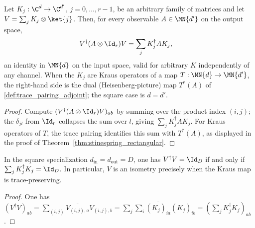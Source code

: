 \begin{theorem}\label{thm:stinespring_dual_representation}
    \leanok
    Let $K_j:\C^{d}\to\C^{d'}$, $j=0,\dots,r-1$, be an arbitrary family of
    matrices and let $V=\sum_j K_j\otimes\ket{j}$. Then, for every observable
    $A\in\MN{d'}$ on the output space,
    \begin{align}
        V^\dagger(A\otimes\Id_r)V
        &=\sum_j K_j^\dagger A K_j,
        \label{eq:representations_stinespring_dual}
    \end{align}
    an identity in $\MN{d}$ on the input space, valid for arbitrary $K$
    independently of any channel. When the $K_j$ are Kraus operators of a map
    $T:\MN{d}\to\MN{d'}$, the right-hand side is the dual
    (Heisenberg-picture) map $T^*(A)$ of \ref{def:trace_pairing_adjoint}; the
    square case is $d=d'$.
\end{theorem}

\begin{proof}
    \leanok
    Compute $(V^\dagger(A\otimes\Id_r)V)_{ab}$
    by summing over the product index $(i,j)$;
    the $\delta_{jl}$ from $\Id_r$ collapses the sum over $l$, giving
    $\sum_j K_j^\dagger A K_j$. For Kraus operators of $T$, the trace
    pairing identifies this sum with $T^*(A)$, as displayed in the proof of
    Theorem~\ref{thm:stinespring_rectangular}.
\end{proof}

\begin{theorem}\label{thm:stinespringV_isometry_iff_kraus_normalized}
    \leanok
    In the square specialization
    $d_{\mathrm{in}}=d_{\mathrm{out}}=D$, one has
    $V^\dagger V=\Id_D$ if and only if
    $\sum_j K_j^\dagger K_j=\Id_D$.
    In particular, $V$ is an isometry precisely when the Kraus map is
    trace-preserving.
\end{theorem}

\begin{proof}
    \leanok
    One has
    $(V^\dagger V)_{ab}
    =\sum_{(i,j)}\overline{V_{(i,j),a}}V_{(i,j),b}
    =\sum_j\sum_i\overline{(K_j)_{ia}}(K_j)_{ib}
    =(\sum_jK_j^\dagger K_j)_{ab}$.
\end{proof}


